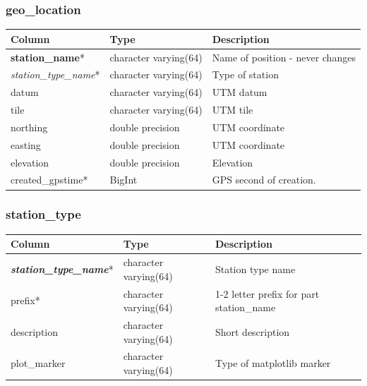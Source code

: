 \documentclass{article}
\begin{document}
{\subsubsection{geo\_location}
\begin{center}
\begin{tabular}{| p{4cm} | p{2cm} | p{10cm} |}
\hline
 {\bf Column} & {\bf Type}  & {\bf Description} \\ [0.5ex]  \hline\hline
{\bf station\_name}*  & character varying(64) & Name of position - never changes \\ \hline
{\em station\_type\_name}* & character varying(64) & Type of station \\ \hline
datum & character varying(64) & UTM datum \\ \hline
tile & character varying(64) & UTM tile \\ \hline
northing & double precision & UTM coordinate \\ \hline
easting & double precision & UTM coordinate \\ \hline
elevation & double precision & Elevation \\ \hline
created\_gpstime* & BigInt & GPS second of creation. \\ \hline
\end{tabular}
\end{center}

\subsubsection{station\_type}
\begin{center}
\begin{tabular}{| p{4cm} | p{2cm} | p{10cm} |}
\hline
 {\bf Column} & {\bf Type}  & {\bf Description} \\ [0.5ex]  \hline\hline
{\bf \em station\_type\_name}* &  character varying(64) &  Station type name \\ \hline
prefix* & character varying(64) & 1-2 letter prefix for part station\_name \\ \hline
description & character varying(64) &  Short description \\ \hline
plot\_marker & character varying(64) & Type of matplotlib marker \\ \hline
\end{tabular}
\end{center}


}
\end{document}
